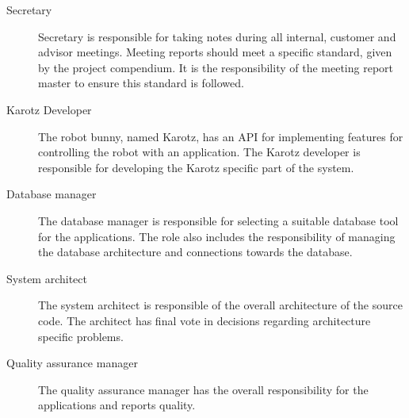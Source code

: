 \begin{description}
	\item[Secretary]
		Secretary is responsible for taking notes during all internal, 
		customer and advisor meetings. Meeting reports should meet a specific standard, 
		given by the project compendium. It is the responsibility of the meeting 
		report master to ensure this standard is followed.

	\item[Karotz Developer]
		The robot bunny, named Karotz, has an API for implementing features for controlling 
		the robot with an application. 
		The Karotz developer is responsible for developing the Karotz specific part of the system. 

	\item[Database manager]
		The database manager is responsible for selecting a suitable database tool for 
		the applications. The role also includes the responsibility of managing the 
		database architecture and connections towards the database.

	\item[System architect]
		The system architect is responsible of the overall architecture of the source code. 
		The architect has final vote in decisions regarding architecture specific problems. 

	\item[Quality assurance manager]
		The quality assurance manager has the overall responsibility for the applications and reports quality.

\end{description}
